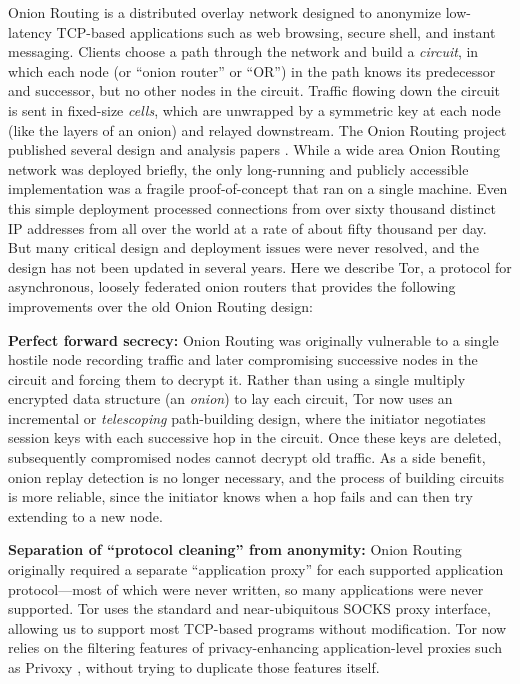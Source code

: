 \documentclass[times,10pt,twocolumn]{article}
\begin{document}
Onion Routing is a distributed overlay network designed to anonymize
low-latency TCP-based applications such as web browsing, secure shell,
and instant messaging. Clients choose a path through the network and
build a \emph{circuit}, in which each node (or ``onion router'' or ``OR'')
in the path knows its predecessor and successor, but no other nodes in
the circuit.  Traffic flowing down the circuit is sent in fixed-size
\emph{cells}, which are unwrapped by a symmetric key at each node
(like the layers of an onion) and relayed downstream. The 
Onion Routing project published several design and analysis papers
\cite{or-ih96,or-jsac98,or-discex00,or-pet00}. While a wide area Onion
Routing network was deployed briefly, the only long-running and
publicly accessible implementation was a fragile
proof-of-concept that ran on a single machine. Even this simple deployment
processed connections from over sixty thousand distinct IP addresses from
all over the world at a rate of about fifty thousand per day.
But many critical design and deployment issues were never
resolved, and the design has not been updated in several years. Here
we describe Tor, a protocol for asynchronous, loosely federated onion
routers that provides the following improvements over the old Onion
Routing design:

\textbf{Perfect forward secrecy:} Onion Routing
was originally vulnerable to a single hostile node recording traffic and
later compromising successive nodes in the circuit and forcing them
to decrypt it. Rather than using a single multiply encrypted data
structure (an \emph{onion}) to lay each circuit,
Tor now uses an incremental or \emph{telescoping} path-building design,
where the initiator negotiates session keys with each successive hop in
the circuit.  Once these keys are deleted, subsequently compromised nodes
cannot decrypt old traffic.  As a side benefit, onion replay detection
is no longer necessary, and the process of building circuits is more
reliable, since the initiator knows when a hop fails and can then try
extending to a new node.

\textbf{Separation of ``protocol cleaning'' from anonymity:}
Onion Routing originally required a separate ``application
proxy'' for each supported application protocol---most of which were
never written, so many applications were never supported.  Tor uses the
standard and near-ubiquitous SOCKS \cite{socks4} proxy interface, allowing
us to support most TCP-based programs without modification.  Tor now
relies on the filtering features of privacy-enhancing
application-level proxies such as Privoxy \cite{privoxy}, without trying
to duplicate those features itself.
\end{document}
